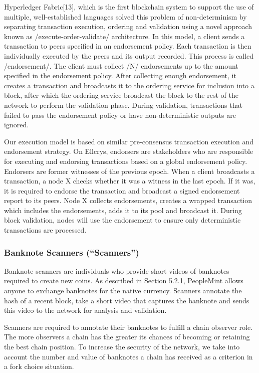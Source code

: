 Hyperledger Fabric[13], which is the first blockchain system to support the use of multiple, well-established languages solved this problem of non-determinism by separating transaction execution, ordering and validation using a novel approach known as /execute-order-validate/ architecture. In this model, a client sends a transaction to peers specified in an endorsement policy. Each transaction is then individually executed by the peers and its output recorded. This process is called /endorsement/. The client must collect /N/ endorsements up to the amount specified in the endorsement policy. After collecting enough endorsement, it creates a transaction and broadcasts it to the ordering service for inclusion into a block, after which the ordering service broadcast the block to the rest of the network to perform the validation phase. During validation, transactions that failed to pass the endorsement policy or have non-deterministic outputs are ignored.

Our execution model is based on similar pre-consensus transaction execution and endorsement strategy. On Ellcrys, endorsers are stakeholders who are responsible for executing and endorsing transactions based on a global endorsement policy. Endorsers are former witnesses of the previous epoch. When a client broadcasts a transaction, a node X checks whether it was a witness in the last epoch. If it was, it is required to endorse the transaction and broadcast a signed endorsement report to its peers. Node X collects endorsements, creates a wrapped transaction which includes the endorsements, adds it to its pool and broadcast it. During block validation, nodes will use the endorsement to ensure only deterministic transactions are processed.

\subsubsection{Banknote Scanners (“Scanners”)}
Banknote scanners are individuals who provide short videos of banknotes required to create new coins. As described in Section 5.2.1, PeopleMint allows anyone to exchange banknotes for the native currency. Scanners annotate the hash of a recent block, take a short video that captures the banknote and sends this video to the network for analysis and validation.

Scanners are required to annotate their banknotes to fulfill a chain observer role. The more observers a chain has the greater its chances of becoming or retaining the best chain position. To increase the security of the network, we take into account the number and value of banknotes a chain has received as a criterion in a fork choice situation.


